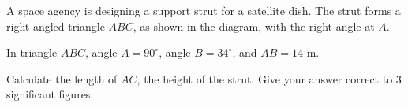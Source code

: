 \begin{question}
\noindent A space agency is designing a support strut for a satellite dish. The strut forms a right-angled triangle $ABC$, as shown in the diagram, with the right angle at $A$.

\begin{center}
\end{center}

\noindent In triangle $ABC$, angle $A = 90^{\circ}$, angle $B = 34^{\circ}$, and $AB = 14$ m.

Calculate the length of $AC$, the height of the strut.
Give your answer correct to 3 significant figures.
\vspace{4cm}
\begin{flushright}
\end{flushright}
\end{question}
